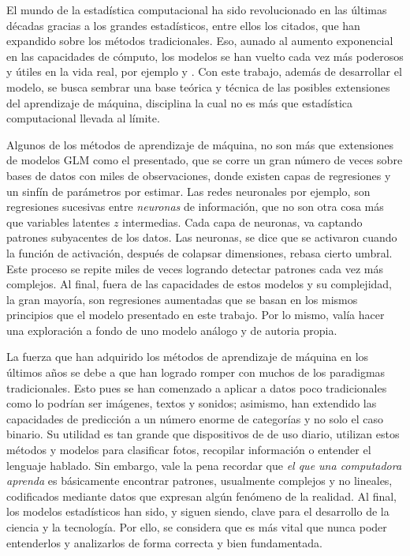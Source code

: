 \documentclass[../Main/Main.tex]{subfiles}
\begin{document}
El mundo de la estadística computacional ha sido revolucionado en las últimas décadas gracias a los grandes estadísticos, entre ellos los citados, que han expandido sobre los métodos tradicionales. Eso, aunado al aumento exponencial en las capacidades de cómputo, los modelos se han vuelto cada vez más poderosos y útiles en la vida real, por ejemplo \citet{madan2015automated} y \citet{shah2014bayesian}. Con este trabajo, además de desarrollar el modelo, se busca sembrar una base teórica y técnica de las posibles extensiones del aprendizaje de máquina, disciplina la cual no es más que estadística computacional llevada al límite.

Algunos de los métodos de aprendizaje de máquina, no son más que extensiones de modelos GLM como el presentado, que se corre un gran número de veces sobre bases de datos con miles de observaciones, donde existen capas de regresiones y un sinfín de parámetros por estimar. Las redes neuronales por ejemplo, son regresiones sucesivas entre \textit{neuronas} de información, que no son otra cosa más que variables latentes $z$ intermedias. Cada capa de neuronas, va captando patrones subyacentes de los datos. Las neuronas, se dice que se activaron cuando la función de activación, después de colapsar dimensiones, rebasa cierto umbral. Este proceso se repite miles de veces logrando detectar patrones cada vez más complejos. Al final, fuera de las capacidades de estos modelos y su complejidad, la gran mayoría, son regresiones aumentadas que se basan en los mismos principios que el modelo presentado en este trabajo. Por lo mismo, valía hacer una exploración a fondo de uno modelo análogo y de autoria propia. 

La fuerza que han adquirido los métodos de aprendizaje de máquina en los últimos años se debe a que han logrado romper con muchos de los paradigmas tradicionales. Esto pues se han comenzado a aplicar a datos poco tradicionales como lo podrían ser imágenes, textos y sonidos; asimismo, han extendido las capacidades de predicción a un número enorme de categorías y no solo el caso binario. Su utilidad es tan grande que dispositivos de de uso diario, utilizan estos métodos y modelos para clasificar fotos, recopilar información o entender el lenguaje hablado. Sin embargo, vale la pena recordar que \textit{el que una computadora aprenda} es básicamente encontrar patrones, usualmente complejos y no lineales, codificados mediante datos que expresan algún fenómeno de la realidad. Al final, los modelos estadísticos han sido, y siguen siendo, clave para el desarrollo de la ciencia y la tecnología. Por ello, se considera que es más vital que nunca poder entenderlos y analizarlos de forma correcta y bien fundamentada. 
\end{document}
